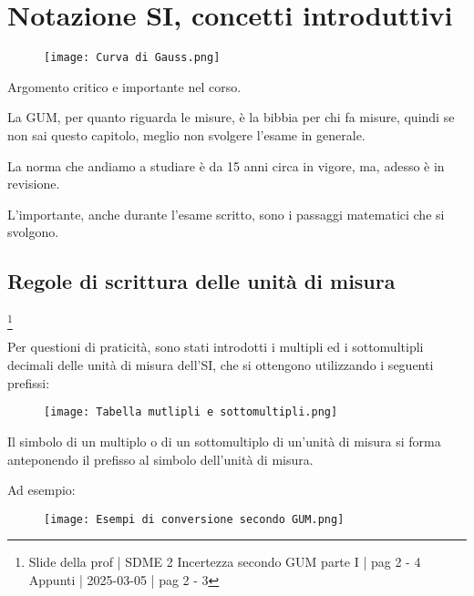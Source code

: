 \chapter{Notazione SI, concetti introduttivi}

\begin{figure}[h]
    \centering
    \texttt{[image: Curva di Gauss.png]}
\end{figure}

\newpage 

\begin{tcolorbox}
    Argomento critico e importante nel corso. \newline

    La GUM, per quanto riguarda le misure, è la bibbia per chi fa misure, 
    quindi se non sai questo capitolo, meglio non svolgere l'esame in generale. \newline 
    
    La norma che andiamo a studiare è da 15 anni circa in vigore, 
    ma, adesso è in revisione. \newline 

    L'importante, anche durante l'esame scritto, sono i passaggi matematici che si svolgono. 
\end{tcolorbox}

\section{Regole di scrittura delle unità di misura}
\footnote{Slide della prof | SDME 2 Incertezza secondo GUM parte I | pag 2 - 4 \\  
Appunti | 2025-03-05 | pag 2 - 3}

Per questioni di praticità, sono stati introdotti i multipli ed i sottomultipli decimali delle unità di misura 
dell'SI, che si ottengono utilizzando i seguenti prefissi: 

\begin{figure}[h]
    \centering
    \texttt{[image: Tabella mutlipli e sottomultipli.png]}
\end{figure}

Il simbolo di un multiplo o di un sottomultiplo di un'unità di misura 
si forma anteponendo il prefisso al simbolo dell'unità di misura. \newline 

Ad esempio: 

\begin{figure}[h]
    \centering
    \texttt{[image: Esempi di conversione secondo GUM.png]}
\end{figure}


